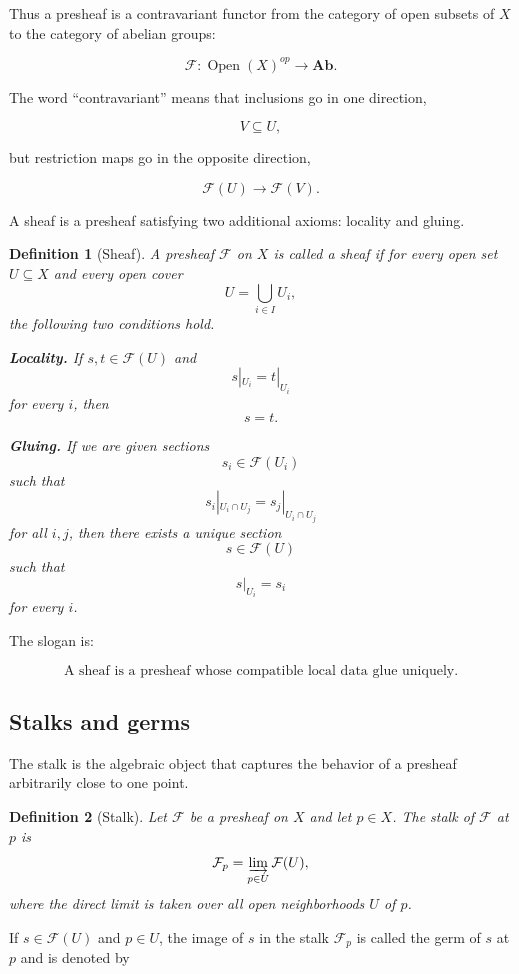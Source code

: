\documentclass[12pt,a4paper]{article}
\newtheorem{definition}{Definition}[section]
\begin{document}
Thus a presheaf is a contravariant functor from the category of open subsets
of $X$ to the category of abelian groups:

\[
\mathcal F : \operatorname{Open}(X)^{op}
\longrightarrow
\mathbf{Ab}.
\]

The word ``contravariant'' means that inclusions go in one direction,

\[
V \subseteq U,
\]

but restriction maps go in the opposite direction,

\[
\mathcal F(U) \longrightarrow \mathcal F(V).
\]


A sheaf is a presheaf satisfying two additional axioms: locality and gluing.

\begin{definition}[Sheaf]
	A presheaf $\mathcal F$ on $X$ is called a sheaf if for every open set
	$U \subseteq X$ and every open cover
	\[
	U = \bigcup_{i \in I} U_i,
	\]
	the following two conditions hold.
	
	\textbf{Locality.}
	If $s,t \in \mathcal F(U)$ and
	\[
	s|_{U_i} = t|_{U_i}
	\]
	for every $i$, then
	\[
	s=t.
	\]
	
	\textbf{Gluing.}
	If we are given sections
	\[
	s_i \in \mathcal F(U_i)
	\]
	such that
	\[
	s_i|_{U_i \cap U_j}
	=
	s_j|_{U_i \cap U_j}
	\]
	for all $i,j$, then there exists a unique section
	\[
	s \in \mathcal F(U)
	\]
	such that
	\[
	s|_{U_i}=s_i
	\]
	for every $i$.
\end{definition}

The slogan is:

\[
\boxed{
	\text{A sheaf is a presheaf whose compatible local data glue uniquely.}
}
\]

\subsection{Stalks and germs}

The stalk is the algebraic object that captures the behavior of a presheaf
arbitrarily close to one point.

\begin{definition}[Stalk]
	Let $\mathcal F$ be a presheaf on $X$ and let $p \in X$.
	The stalk of $\mathcal F$ at $p$ is
	\[
	\mathcal F_p
	=
	\varinjlim_{p \in U} \mathcal F(U),
	\]
	where the direct limit is taken over all open neighborhoods $U$ of $p$.
\end{definition}

If $s \in \mathcal F(U)$ and $p \in U$, the image of $s$ in the stalk
$\mathcal F_p$ is called the germ of $s$ at $p$ and is denoted by
\end{document}
